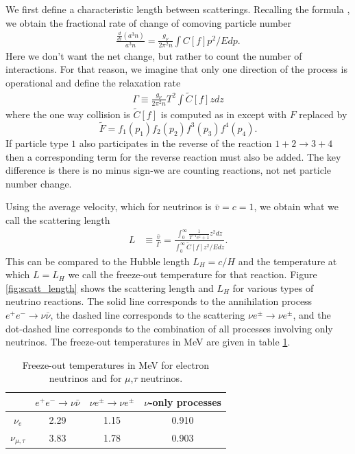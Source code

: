 We first define a characteristic length between scatterings. Recalling the formula , we obtain the fractional rate of change of comoving particle number
\begin{align}
\frac{\frac{d}{dt}(a^3 n)}{a^3n}=\frac{g_\nu}{2\pi^2n}\int C[f]p^2/Edp.
\end{align}
Here we don't want the net change, but rather to count the number of interactions.  For that reason, we imagine that only one direction of the process is operational and define the relaxation rate
\begin{align}
\Gamma\equiv\frac{g_\nu}{2\pi^2n}T^2\int \tilde C[f]zdz
\end{align}
where the one way collision is $\tilde C[f]$ is computed as in  except with $F$ replaced by 
\begin{equation}
\tilde F=f_1(p_1)f_2(p_2)f^3(p_3)f^4(p_4).
\end{equation}
If particle type $1$ also participates in the reverse of the reaction $1+2\rightarrow 3+4$ then a corresponding term for the reverse reaction must also be added.  The key difference is there is no minus sign-we are counting reactions, not net particle number change.

Using the average velocity, which for neutrinos is $\bar v=c=1$, we obtain what we call the scattering length
\begin{align}
L&\equiv\frac{\bar v}{\Gamma}=\frac{\int_0^\infty\frac{1}{\Upsilon^{-1}e^z+1}z^2dz}{\int_0^\infty \tilde C[f] z^2/E dz}.
\end{align}
This can be compared to the Hubble length $L_H=c/H$ and the temperature at which $L=L_H$ we call the freeze-out temperature for that reaction.  Figure \ref{fig:scatt_length} shows the scattering length and $L_H$ for various types of neutrino reactions.  The solid line corresponds to the annihilation process $e^+e^-\rightarrow \nu\bar\nu$, the dashed line corresponds to the scattering $\nu e^\pm\rightarrow \nu e^\pm$, and the dot-dashed line corresponds to the combination of all processes involving only neutrinos.  The freeze-out temperatures in MeV are given in table \ref{table:freezeout_temp}.

\begin{table}[ht]
\centering 
\begin{tabular}{|c|c|c|c|}
\hline
              & $e^+e^-\rightarrow \nu\bar\nu$ & $\nu e^\pm\rightarrow \nu e^\pm$ & $\nu$-only processes\\
\hline
$\nu_e$ &2.29 & 1.15&0.910\\
\hline
$\nu_{\mu,\tau}$ &3.83 & 1.78& 0.903\\
\hline
\end{tabular}
\caption{Freeze-out temperatures in MeV for electron neutrinos and for $\mu$,$\tau$ neutrinos.}
\label{table:freezeout_temp}
\end{table}

